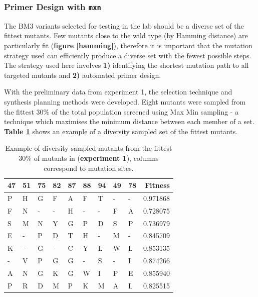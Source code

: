 \documentclass{article}
\begin{document}
\subsubsection{Primer Design with \texttt{mxn}} \label{mxn evo}
The BM3 variants selected for testing in the lab should be a diverse set of the fittest mutants. Few mutants close to the wild type (by Hamming distance) are particularly fit (\textbf{figure \ref{hamming}}), therefore it is important that the mutation strategy used can efficiently produce a diverse set with the fewest possible steps. The strategy used here involves \textbf{1)} identifying the shortest mutation path to all targeted mutants and \textbf{2)} automated primer design. %

\par
With the preliminary data from experiment 1, the selection technique and synthesis planning methods were developed. Eight mutants were sampled from the fittest 30\% of the total population screened using Max Min sampling - a technique which maximises the minimum distance between each member of a set. %
\textbf{Table \ref{mutant table}} shows an example of a diversity sampled set of the fittest mutants. %

\begin{table}[h]
	\centering
\begin{tabular}{lllllllllr}
	\textbf{47} &   \textbf{51} &   \textbf{75} &   \textbf{82} & \textbf{87} &   \textbf{88} &   \textbf{94} &   \textbf{49} &   \textbf{78} &   \textbf{Fitness} \\
\hline
   P &    H &    G &    F &  A &    F &    T &  - &  - &  0.971868 \\
   F &    N &  - &  - &  H &  - &  - &    F &    A &  0.728075 \\
   S &    M &    N &    Y &  G &    P &    D &    S &    P &  0.736979 \\
   E &  - &    P &    D &  T &    H &  - &    M &  - &  0.845709 \\
   K &  - &    G &  - &  C &    Y &    L &    W &    L &  0.853135 \\
 - &    V &    P &    G &  G &  - &    S &  - &    I &  0.874266 \\
   A &    N &    G &    K &  G &    W &    I &    P &    E &  0.855940 \\
   P &    R &    D &    M &  P &    K &    M &    A &    L &  0.825515 \\
\end{tabular}
	\caption{\label{mutant table} Example of diversity sampled mutants from the fittest 30\% of mutants in (\textbf{experiment 1}), columns correspond to mutation sites.}
\end{table}
\end{document}
